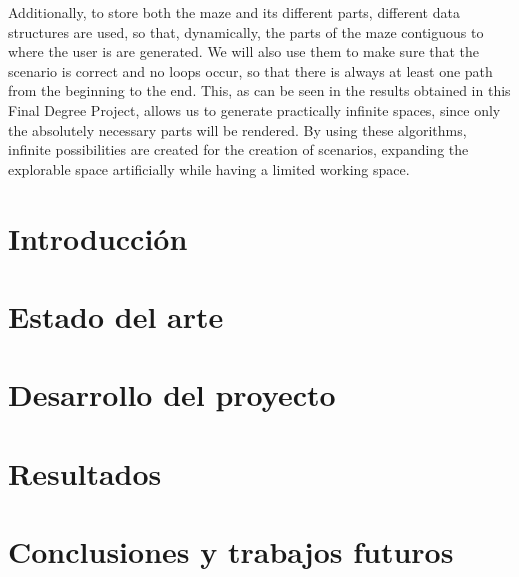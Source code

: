 \documentclass[a4paper]{report}
\newcommand\paginablanco{%
    \null
    \thispagestyle{empty}%
    \newpage}
\begin{document}
Additionally, to store both the maze and its different parts, different data structures are used, so that, dynamically, the parts of the maze contiguous to where the user is are generated. We will also use them to make sure that the scenario is correct and no loops occur, so that there is always at least one path from the beginning to the end.\vspace{2mm}\newline
This, as can be seen in the results obtained in this Final Degree Project, allows us to generate practically infinite spaces, since only the absolutely necessary parts will be rendered. By using these algorithms, infinite possibilities are created for the creation of scenarios, expanding the explorable space artificially while having a limited working space.

\tableofcontents
\newpage
\newpage
\listoffigures
\newpage

\paginablanco{}

\chapter{Introducción}

\chapter{Estado del arte}

\chapter{Desarrollo del proyecto}

\chapter{Resultados}

\chapter{Conclusiones y trabajos futuros}

\newpage


\end{document}
